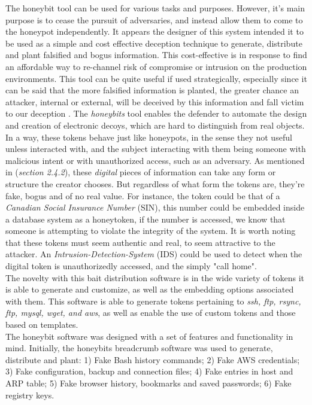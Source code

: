 \documentclass[grad,lot,lof,11pt,oneside,onehalfspace]{RUthesis}
\begin{document}
The honeybit tool can be used for various tasks and purposes. However, it's main purpose is to cease the pursuit of adversaries, and instead allow them to come to the honeypot independently. It appears the designer of this system intended it to be used as a simple and cost effective deception technique to generate, distribute and plant falsified and bogus information. This cost-effective is in response to find an affordable way to re-channel risk of compromise or intrusion on the production environments. This tool can be quite useful if used strategically, especially since it can be said that the more falsified information is planted, the greater chance an attacker, internal or external, will be deceived by this information and fall victim to our deception \cite{ka_honeybits:_2018}. The \textit{honeybits} tool enables the defender to automate the design and creation of electronic decoys, which are hard to distinguish from real objects. 
In a way, these tokens behave just like honeypots, in the sense they not useful unless interacted with, and the subject interacting with them being someone with malicious intent or with unauthorized access, such as an adversary. As mentioned in (\textit{section 2.4.2}), these \textit{digital} pieces of information can take any form or structure the creator chooses. But regardless of what form the tokens are, they're fake, bogus and of no real value. For instance, the token could be that of a \textit{Canadian Social Insurance Number} (SIN), this number could be embedded inside a database system as a honeytoken, if the number is accessed, we know that someone is attempting to violate the integrity of the system. It is worth noting that these tokens must seem authentic and real, to seem attractive to the attacker. An \textit{Intrusion-Detection-System} (IDS) could be used to detect when the digital token is unauthorizedly accessed, and the simply "call home".\\
The novelty with this bait distribution software is in the wide variety of tokens it is able to generate and customize, as well as the embedding options associated with them. This software is able to generate tokens pertaining to \textit{ssh, ftp, rsync, ftp, mysql, wget, and aws}, as well as enable the use of custom tokens and those based on templates. \\
The honeybit software was designed with a set of features and functionality in mind. Initially, the honeybits breadcrumb software was used to generate, distribute and plant: 1) Fake Bash history commands; 2) Fake AWS credentials; 3) Fake configuration, backup and connection files; 4) Fake entries in host and ARP table; 5) Fake browser history, bookmarks and saved passwords; 6) Fake registry keys. \\
\end{document}
